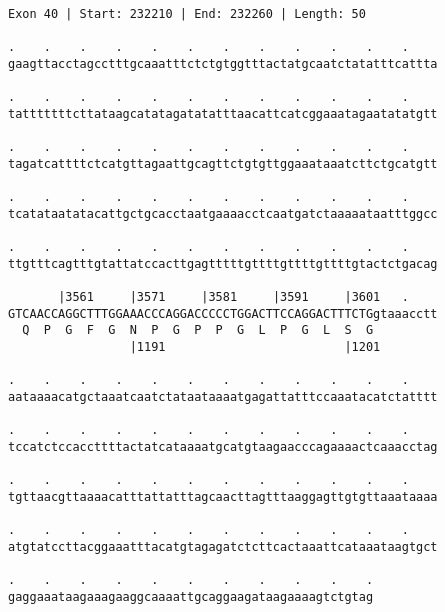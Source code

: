 \documentclass{article}
\begin{document}
\begin{Verbatim}[fontfamily=courier]
Exon 40 | Start: 232210 | End: 232260 | Length: 50

.    .    .    .    .    .    .    .    .    .    .    .    
gaagttacctagcctttgcaaatttctctgtggtttactatgcaatctatatttcattta

.    .    .    .    .    .    .    .    .    .    .    .    
tatttttttcttataagcatatagatatatttaacattcatcggaaatagaatatatgtt

.    .    .    .    .    .    .    .    .    .    .    .    
tagatcattttctcatgttagaattgcagttctgtgttggaaataaatcttctgcatgtt

.    .    .    .    .    .    .    .    .    .    .    .    
tcatataatatacattgctgcacctaatgaaaacctcaatgatctaaaaataatttggcc

.    .    .    .    .    .    .    .    .    .    .    .    
ttgtttcagtttgtattatccacttgagtttttgttttgttttgttttgtactctgacag

       |3561     |3571     |3581     |3591     |3601   .    
GTCAACCAGGCTTTGGAAACCCAGGACCCCCTGGACTTCCAGGACTTTCTGgtaaacctt
  Q  P  G  F  G  N  P  G  P  P  G  L  P  G  L  S  G         
                 |1191                         |1201        

.    .    .    .    .    .    .    .    .    .    .    .    
aataaaacatgctaaatcaatctataataaaatgagattatttccaaatacatctatttt

.    .    .    .    .    .    .    .    .    .    .    .    
tccatctccaccttttactatcataaaatgcatgtaagaacccagaaaactcaaacctag

.    .    .    .    .    .    .    .    .    .    .    .    
tgttaacgttaaaacatttattatttagcaacttagtttaaggagttgtgttaaataaaa

.    .    .    .    .    .    .    .    .    .    .    .    
atgtatccttacggaaatttacatgtagagatctcttcactaaattcataaataagtgct

.    .    .    .    .    .    .    .    .    .    .
gaggaaataagaaagaaggcaaaattgcaggaagataagaaaagtctgtag
\end{Verbatim}
\newpage
\end{document}
